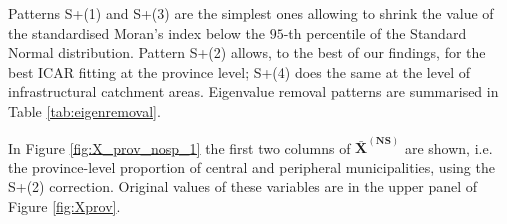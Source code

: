 \documentclass[openany, 11pt, oneside]{book}
\begin{document}
Patterns S+(1) and S+(3) are the simplest ones allowing to shrink the value of the standardised Moran's index below the $95$-th percentile of the Standard Normal distribution. Pattern S+(2) allows, to the best of our findings, for the best ICAR fitting at the province level; S+(4) does the same at the level of infrastructural catchment areas. Eigenvalue removal patterns are summarised in Table \ref{tab:eigenremoval}.

In Figure \ref{fig:X_prov_nosp_1} the first two columns of $\boldsymbol{\bar{X}^{(NS)}}$ are shown, i.e. the province-level proportion of central and peripheral municipalities, using the S+(2) correction. Original values of these variables are in the upper panel of Figure \ref{fig:Xprov}.


\begin{table}[ht]
\end{table}
\end{document}
